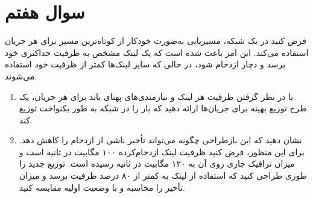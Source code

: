 \section{سوال هفتم}

فرض کنید در یک شبکه، مسیریابی به‌صورت خودکار از کوتاه‌ترین مسیر برای هر جریان استفاده می‌کند. این امر باعث شده است که یک لینک مشخص به ظرفیت حداکثری خود برسد و دچار ازدحام شود، در حالی که سایر لینک‌ها کمتر از ظرفیت خود استفاده می‌شوند.

\begin{enumerate}
	\item 
	با در نظر گرفتن ظرفیت هر لینک و نیازمندی‌های پهنای باند برای هر جریان، یک طرح توزیع بهینه برای جریان‌ها ارائه دهید که بار را در شبکه به طور یکنواخت توزیع کند.
	
	
	\item 
	نشان دهید که این بازطراحی چگونه می‌تواند تأخیر ناشی از ازدحام را کاهش دهد. برای این منظور، فرض کنید ظرفیت لینک ازدحام‌کرده ۱۰۰ مگابیت در ثانیه است و میزان ترافیک جاری روی آن به ۱۲۰ مگابیت در ثانیه رسیده است. توزیع جدید را طوری طراحی کنید که استفاده از لینک به کمتر از ۸۰ درصد ظرفیت برسد و میزان تأخیر را محاسبه و با وضعیت اولیه مقایسه کنید.
\end{enumerate}